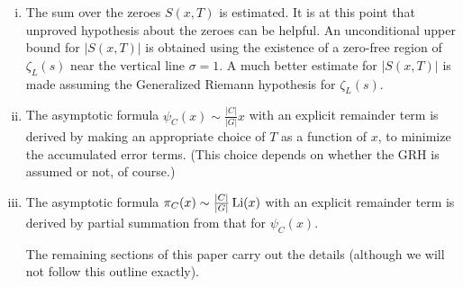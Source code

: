 \documentclass[./main]{subfiles}
\begin{document}
\begin{enumerate}[(i)]
    \item The sum over the zeroes $S(x, T)$ is estimated.
    It is at this point that unproved hypothesis about the zeroes can be helpful.
    An unconditional upper bound for $|S(x, T)|$ is obtained using the existence of a zero-free region of $\zeta_L(s)$ near the vertical line $\sigma =1$.
    A much better estimate for $|S(x, T)|$ is made assuming the Generalized Riemann hypothesis for $\zeta_L(s)$.
    
    \item The asymptotic formula $\psi_C(x) \sim \frac{|C|}{|G|}x$ with an explicit remainder term is derived by making an appropriate choice of $T$ as a function of $x$, to minimize the accumulated error terms.
    (This choice depends on whether the GRH is assumed or not, of course.)
    
    \item The asymptotic formula $\pi_C(x) \sim \frac{|C|}{|G|}\operatorname{Li}(x)$ with an explicit remainder term is derived by partial summation from that for $\psi_C(x)$.
    
    The remaining sections of this paper carry out the details (although we will not follow this outline exactly).
\end{enumerate}
\end{document}
